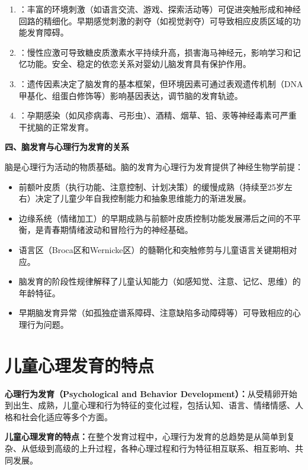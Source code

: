 \begin{keybox}
\begin{enumerate}[leftmargin=*]
    \item {}：丰富的环境刺激（如语言交流、游戏、探索活动等）可促进突触形成和神经回路的精细化。早期感觉刺激的剥夺（如视觉剥夺）可导致相应皮质区域的功能发育障碍。

    \item {}：慢性应激可导致糖皮质激素水平持续升高，损害海马神经元，影响学习和记忆功能。安全、稳定的依恋关系对婴幼儿脑发育具有保护作用。

    \item {}：遗传因素决定了脑发育的基本框架，但环境因素可通过表观遗传机制（DNA甲基化、组蛋白修饰等）影响基因表达，调节脑的发育轨迹。

    \item {}：孕期感染（如风疹病毒、弓形虫）、酒精、烟草、铅、汞等神经毒素可严重干扰脑的正常发育。
\end{enumerate}

\textbf{四、脑发育与心理行为发育的关系}

脑是心理行为活动的物质基础。脑的发育为心理行为发育提供了神经生物学前提：

\begin{itemize}[leftmargin=*]
    \item 前额叶皮质（执行功能、注意控制、计划决策）的缓慢成熟（持续至25岁左右）决定了儿童少年自我控制能力和抽象思维能力的渐进发展。
    \item 边缘系统（情绪加工）的早期成熟与前额叶皮质控制功能发展滞后之间的不平衡，是青春期情绪波动和冒险行为的神经基础。
    \item 语言区（Broca区和Wernicke区）的髓鞘化和突触修剪与儿童语言关键期相对应。
    \item 脑发育的阶段性规律解释了儿童认知能力（如感知觉、注意、记忆、思维）的年龄特征。
    \item 早期脑发育异常（如孤独症谱系障碍、注意缺陷多动障碍等）可导致相应的心理行为问题。
\end{itemize}
\end{keybox}

\section{儿童心理发育的特点}

\begin{keybox}
\textbf{心理行为发育（Psychological and Behavior Development）：}从受精卵开始到出生、成熟，儿童心理和行为特征的变化过程，包括认知、语言、情绪情感、人格和社会化适应等多个方面。

\textbf{儿童心理发育的特点：}在整个发育过程中，心理行为发育的总趋势是从简单到复杂、从低级到高级的上升过程，各种心理过程和行为特征相互联系、相互影响、共同发展。
\end{keybox}

